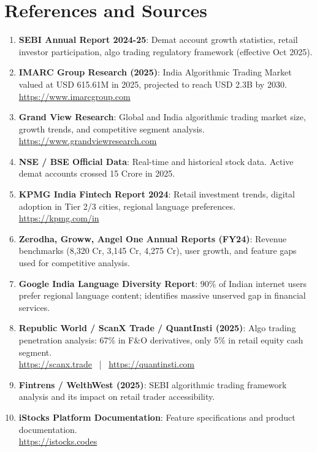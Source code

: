 \documentclass[11pt,a4paper]{article}
\newcommand{\rupee}{\text{\textrupee}}
\begin{document}
\newpage

\section{References and Sources}

\begin{enumerate}[leftmargin=*]
    \item \textbf{SEBI Annual Report 2024-25}: Demat account growth statistics, retail investor participation, algo trading regulatory framework (effective Oct 2025).
    
    \item \textbf{IMARC Group Research (2025)}: India Algorithmic Trading Market valued at USD 615.61M in 2025, projected to reach USD 2.3B by 2030.\\
    \url{https://www.imarcgroup.com}
    
    \item \textbf{Grand View Research}: Global and India algorithmic trading market size, growth trends, and competitive segment analysis.\\
    \url{https://www.grandviewresearch.com}
    
    \item \textbf{NSE / BSE Official Data}: Real-time and historical stock data. Active demat accounts crossed 15 Crore in 2025.
    
    \item \textbf{KPMG India Fintech Report 2024}: Retail investment trends, digital adoption in Tier 2/3 cities, regional language preferences.\\
    \url{https://kpmg.com/in}
    
    \item \textbf{Zerodha, Groww, Angel One Annual Reports (FY24)}: Revenue benchmarks (\rupee8,320 Cr, \rupee3,145 Cr, \rupee4,275 Cr), user growth, and feature gaps used for competitive analysis.
    
    \item \textbf{Google India Language Diversity Report}: 90\% of Indian internet users prefer regional language content; identifies massive unserved gap in financial services.
    
    \item \textbf{Republic World / ScanX Trade / QuantInsti (2025)}: Algo trading penetration analysis: 67\% in F\&O derivatives, only 5\% in retail equity cash segment.\\
    \url{https://scanx.trade} ~|~ \url{https://quantinsti.com}
    
    \item \textbf{Fintrens / WelthWest (2025)}: SEBI algorithmic trading framework analysis and its impact on retail trader accessibility.
    
    \item \textbf{iStocks Platform Documentation}: Feature specifications and product documentation.\\
    \url{https://istocks.codes}
\end{enumerate}
\end{document}
